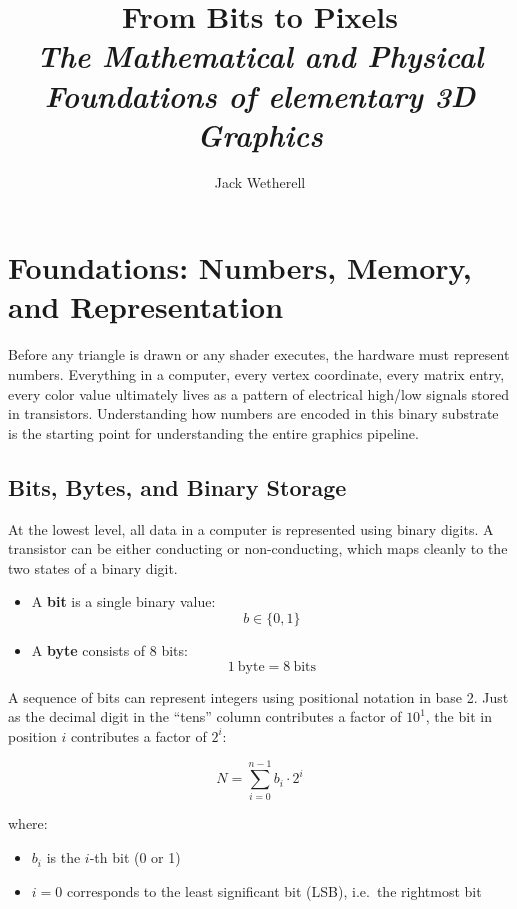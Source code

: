 \documentclass[11pt]{article}
\title{\textbf{From Bits to Pixels} \\
\large \textit{The Mathematical and Physical Foundations of elementary 3D Graphics}}
\author{Jack Wetherell}
\date{}
\begin{document}
\maketitle
\tableofcontents
\newpage

\section{Foundations: Numbers, Memory, and Representation}

Before any triangle is drawn or any shader executes, the hardware must represent numbers. Everything in a computer, every vertex coordinate, every matrix entry, every color value ultimately lives as a pattern of electrical high/low signals stored in transistors. Understanding how numbers are encoded in this binary substrate is the starting point for understanding the entire graphics pipeline.

\subsection{Bits, Bytes, and Binary Storage}

At the lowest level, all data in a computer is represented using binary digits. A transistor can be either conducting or non-conducting, which maps cleanly to the two states of a binary digit.

\begin{itemize}
    \item A \textbf{bit} is a single binary value:
    \begin{equation}
        b \in \{0, 1\}
    \end{equation}

    \item A \textbf{byte} consists of 8 bits:
    \begin{equation}
        1\ \text{byte} = 8\ \text{bits}
    \end{equation}
\end{itemize}

A sequence of bits can represent integers using positional notation in base 2. Just as the decimal digit in the ``tens'' column contributes a factor of $10^1$, the bit in position $i$ contributes a factor of $2^i$:

\begin{equation}
    N = \sum_{i=0}^{n-1} b_i \cdot 2^i
\end{equation}

where:
\begin{itemize}
    \item $b_i$ is the $i$-th bit (0 or 1)
    \item $i = 0$ corresponds to the least significant bit (LSB), i.e.\ the rightmost bit
\end{itemize}
\end{document}
